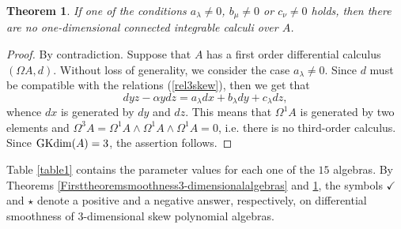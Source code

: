 \documentclass{amsart}
\newtheorem{theorem}{Theorem}[section]
\theoremstyle{definition}
\theoremstyle{remark}
\numberwithin{equation}{section}
\begin{document}
\begin{theorem}\label{Secondtheoremsmoothness3-dimensionalalgebras}
If one of the conditions $a_{\lambda}\not = 0$, $b_{\mu}\not=0$ or $c_{\nu}\not=0$ holds, then there are no one-dimensional connected integrable calculi over $A$.
\end{theorem}
\begin{proof}
By contradiction. Suppose that $A$ has a first order differential calculus $(\Omega A, d)$. Without loss of generality, we consider the case $a_{\lambda}\not =0$. Since $d$ must be compatible with the relations {\rm (}\ref{rel3skew}{\rm )}, then we get that
\begin{equation*}
    dy z-\alpha ydz = a_{\lambda}dx +b_{\lambda}dy + c_{\lambda}dz,
\end{equation*}
whence $dx$ is generated by $dy$ and $dz$. This means that $\Omega^1A$ is generated by two elements and $\Omega^3A=\Omega^1A\wedge\Omega^1A\wedge\Omega^1A=0$, i.e. there is no third-order calculus. Since ${\rm GKdim}(A) = 3$, the assertion follows.
\end{proof}

Table \ref{table1} contains the parameter values for each one of the $15$ algebras. By Theorems \ref{Firsttheoremsmoothness3-dimensionalalgebras} and \ref{Secondtheoremsmoothness3-dimensionalalgebras}, the symbols $\checkmark$ and $\star$ denote a positive and a negative answer, respectively, on differential smoothness of $3$-dimensional skew polynomial algebras.
\end{document}
